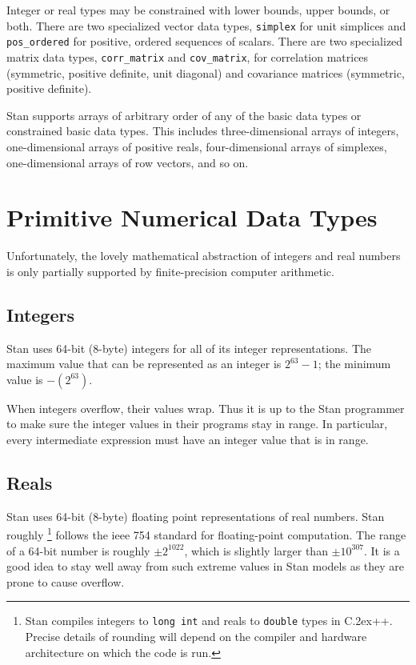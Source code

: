 \documentclass[10pt]{report}
\newcommand{\Stan}{Stan\xspace}
\newcommand*{\Cpp}{C\raise.2ex\hbox{\footnotesize ++}\xspace} %
\newcommand{\code}[1]{{\tt #1}}
\begin{document}
Integer or real types may be constrained with lower bounds, upper
bounds, or both.  There are two specialized vector data types,
\code{simplex} for unit simplices and \code{pos\_ordered} for positive,
ordered sequences of scalars.  There are two specialized matrix data
types, \code{corr\_matrix} and \code{cov\_matrix}, for correlation
matrices (symmetric, positive definite, unit diagonal) and covariance
matrices (symmetric, positive definite). 

\Stan supports arrays of arbitrary order of any of the basic data
types or constrained basic data types.  This includes
three-dimensional arrays of integers, one-dimensional arrays of
positive reals, four-dimensional arrays of simplexes, one-dimensional
arrays of row vectors, and so on.



\section{Primitive Numerical Data Types}

Unfortunately, the lovely mathematical abstraction of integers and
real numbers is only partially supported by finite-precision computer
arithmetic.  

\subsection{Integers}\label{int-data-type.section}

Stan uses 64-bit (8-byte) integers for all of its integer
representations.  The maximum value that can be represented
as an integer is $2^{63}-1$; the minimum value is $-(2^{63})$.

When integers overflow, their values wrap.  Thus it is up to
the \Stan programmer to make sure the integer values in their programs
stay in range.  In particular, every intermediate expression must have
an integer value that is in range.

\subsection{Reals}\label{real-data-type.section}

\Stan uses 64-bit (8-byte) floating point representations of real
numbers.  \Stan roughly%
%
\footnote{\Stan compiles integers to \code{long int} and reals to
  \code{double} types in \Cpp.  Precise details of rounding will depend
  on the compiler and hardware architecture on which the code is run.}
%
follows the {\sc ieee} 754 standard for floating-point computation.
The range of a 64-bit number is roughly $\pm 2^{1022}$, which is
slightly larger than $\pm 10^{307}$.  It is a good idea to stay well
away from such extreme values in \Stan models as they are prone to
cause overflow.
\end{document}
